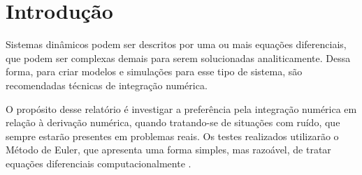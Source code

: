 \documentclass[
	12pt,				%
	openany,			%
	twoside,			%
	a4paper,			%
	english,			%
	french,				%
	spanish,			%
	brazil,				%
	]{abntex2}
\begin{document}

\frenchspacing 


\imprimircapa

\imprimirfolhaderosto*








\tableofcontents*


\textual

\chapter{Introdução}
Sistemas  dinâmicos podem ser descritos por uma ou mais equações diferenciais, que podem ser complexas demais para serem solucionadas analiticamente. Dessa forma, para criar modelos e simulações para esse tipo de sistema, são recomendadas técnicas de integração numérica. 

O propósito desse relatório é investigar a preferência pela integração numérica em relação à derivação numérica, quando tratando-se de situações com ruído, que sempre estarão presentes em problemas reais. Os testes realizados utilizarão o Método de Euler, que apresenta uma forma simples, mas razoável, de tratar equações diferenciais computacionalmente \cite{paulnotes}.
\end{document}
